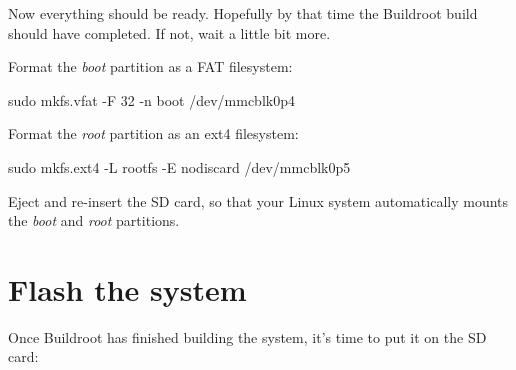 Now everything should be ready. Hopefully by that time the Buildroot
build should have completed. If not, wait a little bit more.

Format the {\em boot} partition as a FAT filesystem:

\begin{bashinput}
sudo mkfs.vfat -F 32 -n boot /dev/mmcblk0p4
\end{bashinput}

Format the {\em root} partition as an ext4 filesystem:

\begin{bashinput}
sudo mkfs.ext4 -L rootfs -E nodiscard /dev/mmcblk0p5
\end{bashinput}

Eject and re-insert the SD card, so that your Linux system
automatically mounts the {\em boot} and {\em root} partitions.

\section{Flash the system}

Once Buildroot has finished building the system, it's time to put it
on the SD card:

